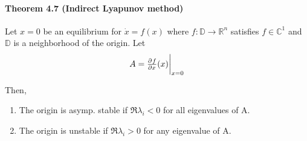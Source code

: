 \paragraph{Theorem 4.7 (Indirect Lyapunov method)}
Let $x=0$ be an equilibrium for $\dot{x} = f(x)$ where $f : \mathbb{D} \rightarrow \mathbb{R}^n$ satisfies $f \in \mathbb{C}^1$ and $\mathbb{D}$ is a neighborhood of the origin. Let
\begin{equation}
	A = \pd{f}{x} (x) \evalat{x=0}
\end{equation}

Then,
\begin{enumerate}
	\item The origin is asymp. stable if $\Re \lambda_i < 0$ for all eigenvalues of A.
	\item The origin is unstable if $\Re \lambda_i > 0$ for any eigenvalue of A.
\end{enumerate}
